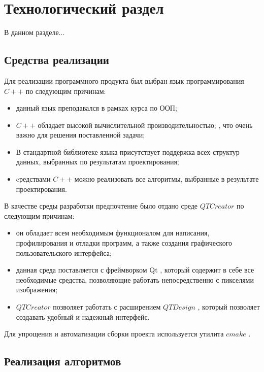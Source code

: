 \chapter{Технологический раздел}

В данном разделе...

\section{Средства реализации}

Для реализации программного продукта был выбран язык программирования $C++$ \cite{info_pl} по следующим причинам:

\begin{itemize}[label*=---]
	\item данный язык преподавался в рамках курса по ООП;
	\item $C++$ обладает высокой вычислительной производительностью; \cite{info_cmpCplplPy, info_cmpCplplJava}, что очень важно для решения поставленной задачи;
	\item В стандартной библиотеке языка присутствует поддержка всех
	структур данных, выбранных по результатам проектирования;
	\item cредствами $C++$ можно реализовать все алгоритмы, выбранные в результате проектирования.
\end{itemize}

В качестве среды разработки предпочтение было отдано среде $QTCreator$ \cite{info_QtCr} по следующим причинам:

\begin{itemize}[label*=---]
	\item он обладает всем необходимым функционалом для написания, профилирования и
	отладки программ, а также создания графического пользовательского интерфейса;
	\item данная среда поставляется с фреймворком Qt \cite{info_QtDoc}, который содержит в себе все необходимые средства, позволяющие работать непосредственно с
	пикселями изображения;
	\item $QTCreator$ позволяет работать с расширением $QT Design$ \cite{info_QtDes}, который позволяет создавать удобный и надежный интерфейс.
\end{itemize}

Для упрощения и автоматизации сборки проекта используется утилита $cmake$ \cite{info_Cmake}.

\section{Реализация алгоритмов}

